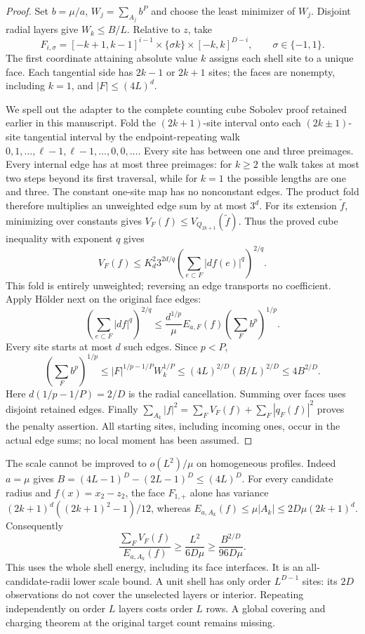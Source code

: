 \begin{proof}
Set $b=\mu/a$, $W_j=\sum_{A_j}b^P$ and choose the least minimizer of
$W_j$. Disjoint radial layers give $W_k\le B/L$. Relative to $z$, take
\[
 F_{i,\sigma}=[-k+1,k-1]^{i-1}\times\{\sigma k\}
                 \times[-k,k]^{D-i},\qquad \sigma\in\{-1,1\}.
\]
The first coordinate attaining absolute value $k$ assigns each shell site
to a unique face. Each tangential side has $2k-1$ or $2k+1$ sites;
the faces are nonempty, including $k=1$, and $|F|\le(4L)^d$.

We spell out the adapter to the complete counting cube Sobolev proof
retained earlier in this manuscript. Fold the $(2k+1)$-site interval
onto each $(2k\pm1)$-site tangential interval by the endpoint-repeating
walk $0,1,\ldots,\ell-1,\ell-1,\ldots,0,0,\ldots$.
Every site has between one and three preimages. Every internal edge has
at most three preimages: for $k\ge2$ the walk takes at most two steps
beyond its first traversal, while for $k=1$ the possible lengths are
one and three. The constant one-site map has no nonconstant edges.
The product fold therefore multiplies an unweighted edge sum by at most
$3^d$. For its extension $\widetilde f$, minimizing over constants gives
$V_F(f)\le V_{Q_{2k+1}}(\widetilde f)$. Thus the proved cube inequality
with exponent $q$ gives
\[
 V_F(f)\le K_d^2 3^{2d/q}
                 \left(\sum_{e\subset F}|df(e)|^q\right)^{2/q}.
\]
This fold is entirely unweighted; reversing an edge transports no
coefficient. Apply H\"older next on the original face edges:
\[
 \left(\sum_{e\subset F}|df|^q\right)^{2/q}
 \le\frac{d^{1/p}}\mu E_{a,F}(f)
               \left(\sum_F b^p\right)^{1/p}.
\]
Every site starts at most $d$ such edges. Since $p<P$,
\[
 \left(\sum_Fb^p\right)^{1/p}
 \le |F|^{1/p-1/P}W_k^{1/P}
 \le(4L)^{2/D}(B/L)^{2/D}\le4B^{2/D}.
\]
Here $d(1/p-1/P)=2/D$ is the radial cancellation. Summing over faces
uses disjoint retained edges. Finally
$\sum_{A_k}|f|^2=\sum_FV_F(f)+\sum_F|q_F(f)|^2$ proves the penalty
assertion. All starting sites, including incoming ones, occur in the
actual edge sums; no local moment has been assumed.
\end{proof}

The scale cannot be improved to $o(L^2)/\mu$ on homogeneous profiles.
Indeed $a=\mu$ gives $B=(4L-1)^D-(2L-1)^D\le(4L)^D$.
For every candidate radius and $f(x)=x_2-z_2$, the face $F_{1,+}$
alone has variance $(2k+1)^d((2k+1)^2-1)/12$, whereas
$E_{a,A_k}(f)\le\mu|A_k|\le2D\mu(2k+1)^d$. Consequently
\[
 \frac{\sum_FV_F(f)}{E_{a,A_k}(f)}
 \ge\frac{L^2}{6D\mu}\ge\frac{B^{2/D}}{96D\mu}.
\]
This uses the whole shell energy, including its face interfaces. It is
an all-candidate-radii lower scale bound. A unit shell has only order
$L^{D-1}$ sites: its $2D$ observations do not cover the unselected
layers or interior. Repeating independently on order $L$ layers costs
order $L$ rows. A global covering and charging theorem at the original
target count remains missing.

